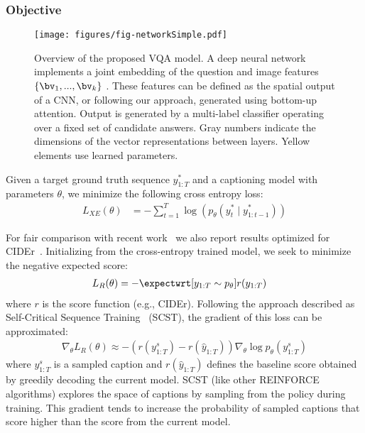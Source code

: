 \documentclass[10pt,twocolumn,letterpaper]{article}
\begin{document}
\subsubsection{Objective}

\begin{figure*}
	\begin{center}
		\texttt{[image: figures/fig-networkSimple.pdf]}
	\end{center}
\caption{Overview of the proposed VQA model. A deep neural network implements a joint embedding of the question and image features $\{\bv_1,...,\bv_k\}$ . These features can be defined as the spatial output of a CNN, or following our approach, generated using bottom-up attention. Output is generated by a multi-label classifier operating over a fixed set of candidate answers. Gray numbers indicate the dimensions of the vector representations between layers. Yellow elements use learned parameters.}
	\label{fig:vqa}
\end{figure*}

Given a target ground truth sequence $y_{1:T}^*$ and a captioning model with parameters $\theta$, we minimize the following cross entropy loss:
\begin{align}
L_{XE}(\theta) &= -\sum_{t=1}^{T}\log(p_{\theta}(y_t^* \mid y_{1:t-1}^*))
\end{align}

For fair comparison with recent work~\cite{scst2016} we also report results optimized for CIDEr~\cite{Vedantam2015}. Initializing from the cross-entropy trained model, we seek to minimize the negative expected score:
\begin{align}
\label{eqn:ciderloss}
L_{R}(\theta) &= -\expectwrt[y_{1:T} \sim p_\theta]{r(y_{1:T})}
\end{align}
\noindent
where $r$ is the score function (e.g., CIDEr). Following the approach described as Self-Critical Sequence Training~\cite{scst2016} (SCST), the gradient of this loss can be approximated:
\begin{align}
\nabla_{\theta}L_{R}(\theta) \approx -(r(y_{1:T}^s)-r(\hat{y}_{1:T}))\nabla_{\theta}\log p_\theta(y_{1:T}^s)
\end{align}
\noindent where $y_{1:T}^s$ is a sampled caption and $r(\hat{y}_{1:T})$ defines the baseline score obtained by greedily decoding the current model. SCST (like other REINFORCE~\cite{Williams:1992:SSG:139611.139614} algorithms) explores the space of captions by sampling from the policy during training. This gradient tends to increase the probability of sampled captions that score higher than the score from the current model. 
\end{document}
